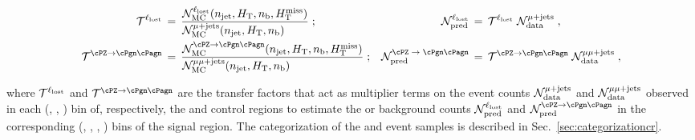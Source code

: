 \begin{align}
  \tf^{\lost} \, & = \,
  \frac{\mathcal{N}^{\lost}_\textrm{MC}(\njet, \scalht, \nb, \mht)}
  {\mathcal{N}^{\mj}_\textrm{MC}(\njet, \scalht, \nb)\hfill} \; ;
  & 
  \mathcal{N}^{\lost}_\textrm{pred} \, & = \,
  \tf^{\lost} \; \mathcal{N}^{\mj}_\textrm{data} \; ,
  \\
  \tf^{\znunu} \, & = \,
  \frac{\mathcal{N}^{\znunu}_\textrm{MC}(\njet, \scalht, \nb, \mht)}
  {\mathcal{N}^{\mmj}_\textrm{MC}(\njet, \scalht, \nb)\hfill} \; ;
  & 
  \mathcal{N}^\textrm{\znunu}_\textrm{pred} \, & = \,
  \tf^{\znunu} \; \mathcal{N}^{\mmj}_\textrm{data} \; ,
\end{align}

where $\mathcal{T}^{\ell_\textrm{lost}}$ and $\tf^{\znunu}$ are the transfer factors that
act as multiplier terms on the event counts
$\mathcal{N}^{\mu + \text{jets}}_\textrm{data}$ and
$\mathcal{N}^{\mu\mu + \text{jets}}_\textrm{data}$ observed in each (\njet, \scalht,
\nb) bin of, respectively, the \mj and \mmj control regions to
estimate the \lost or \znunuj background counts
$\mathcal{N}^{\ell_\textrm{lost}}_\textrm{pred}$ and
$\mathcal{N}^{\znunu}_\textrm{pred}$ in the corresponding (\njet,
\scalht, \nb, \mht) bins of the signal region. The categorization of
the \mj and \mmj event samples is described in
Sec.~\ref{sec:categorizationcr}.

